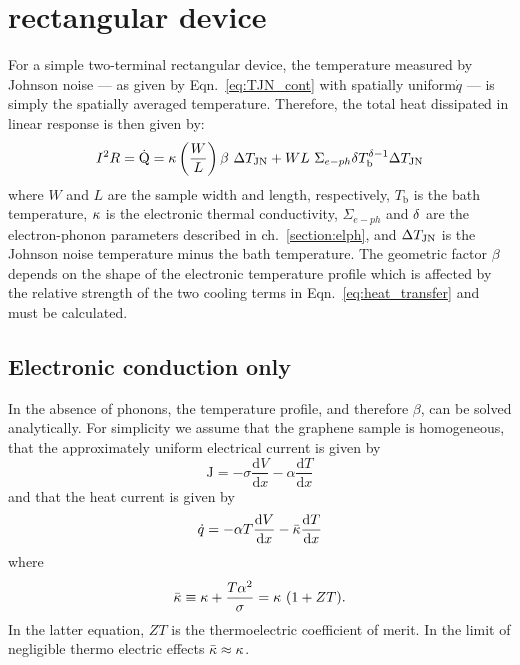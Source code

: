 \section{rectangular device}
For a simple two-terminal rectangular device, the temperature measured by Johnson noise --- as given by Eqn.~\ref{eq:TJN_cont} with spatially uniform$\dot{q}$ --- is simply the spatially averaged temperature. Therefore, the total heat dissipated in linear response is then given by:
\begin{equation}\label{eq:heat_transfer}
I^2R = \dot{\mathrm{Q}} = \mathrm{\kappa}\left(\frac{W}{L}\right)\beta~\Delta T_{\mathrm{JN}} + WL~\Sigma_{e-ph}\mathrm{\delta} T_\mathrm{b}^{\mathrm{\delta}-1}\Delta T_{\mathrm{JN}}
\end{equation}
where $W$ and $L$ are the sample width and length, respectively, $T_\mathrm{b}$ is the bath temperature, $\mathrm{\kappa}$ is the electronic thermal conductivity, $\Sigma_{e-ph}$ and $\mathrm{\delta}$ are the electron-phonon parameters described in ch.~\ref{section:elph}, and $\Delta T_{\mathrm{JN}}$ is the Johnson noise temperature minus the bath temperature. The geometric factor $\beta$ depends on the shape of the electronic temperature profile which is affected by the relative strength of the two cooling terms in Eqn.~\ref{eq:heat_transfer} and must be calculated.

\subsection{Electronic conduction only}
In the absence of phonons, the temperature profile, and therefore $\beta$, can be solved analytically. For simplicity we assume that the graphene sample is homogeneous, that the approximately uniform electrical current is given by 
\begin{equation}
\mathrm{J} = -\sigma \frac{\mathrm{d}V}{\mathrm{d}x} - \alpha \frac{\mathrm{d}T}{\mathrm{d}x}
\end{equation}
and that the heat current is given by \begin{equation}
\dot{q} = -\alpha T\frac{\mathrm{d}V}{\mathrm{d}x} - \bar{\mathrm{\kappa}} \frac{\mathrm{d}T}{\mathrm{d}x}
\end{equation}
where
\begin{equation}
\bar{\mathrm{\kappa}} \equiv \mathrm{\kappa} + \frac{T\alpha^2}{\sigma} = \mathrm{\kappa}~(1+ZT).
\end{equation}
In the latter equation,  $ZT$ is the thermoelectric coefficient of merit. In the limit of negligible thermo electric effects $\bar{\mathrm{\kappa}}\approx\mathrm{\kappa}$. 


